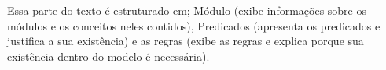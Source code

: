 Essa parte do texto é estruturado em; Módulo (exibe informações sobre os módulos e os conceitos neles contidos), Predicados (apresenta os predicados e justifica a sua existência) e as regras (exibe as regras e explica porque sua existência dentro do modelo é necessária). 